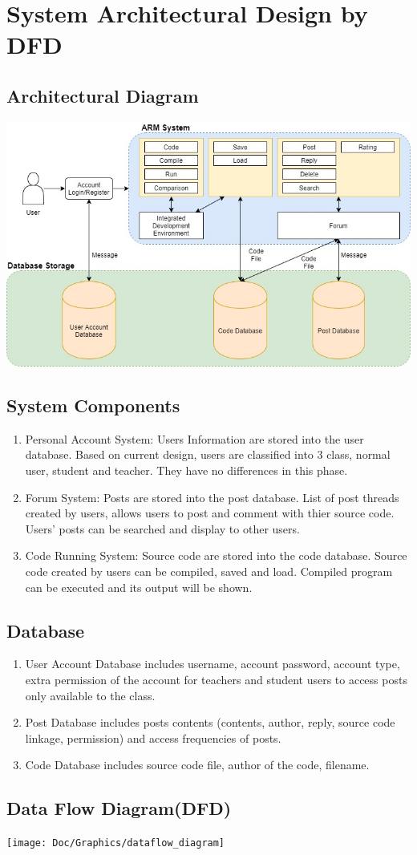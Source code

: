 \chapter{System Architectural Design by DFD}
\section{Architectural Diagram}
\includegraphics[scale=0.5]{Doc/Graphics/architectural_diagram}
\newpage
\section{System Components}
\begin{enumerate}
	\item Personal Account System: Users Information are stored into the user database. Based on current design, users are classified into 3 class, normal user, student and teacher. They have no differences in this phase.
	\item Forum System: Posts are stored into the post database. List of post threads created by users, allows users to post and comment with thier source code. Users' posts can be searched and display to other users.
	\item Code Running System: Source code are stored into the code database. Source code created by users can be compiled, saved and load. Compiled program can be executed and its output will be shown.
\end{enumerate}
\section{Database}
\begin{enumerate}
	\item User Account Database includes username, account password, account type, extra permission of the account for teachers and student users to access posts only available to the class.
	\item Post Database includes posts contents (contents, author, reply, source code linkage, permission) and access frequencies of posts.
  \item Code Database includes source code file, author of the code, filename.
\end{enumerate}
\section{Data Flow Diagram(DFD)}
\texttt{[image: Doc/Graphics/dataflow\_diagram]}
